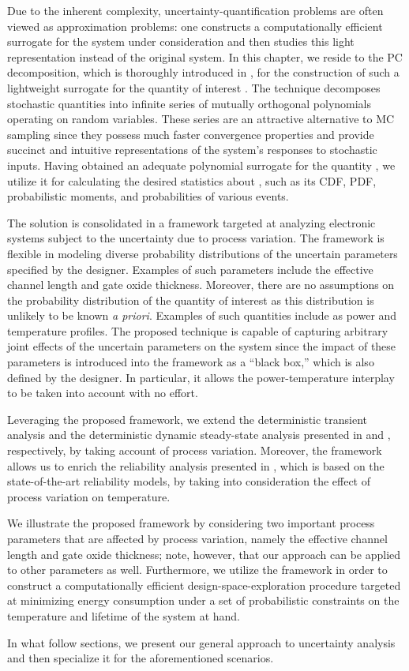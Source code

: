 Due to the inherent complexity, uncertainty-quantification problems are often
viewed as approximation problems: one constructs a computationally efficient
surrogate for the system under consideration and then studies this light
representation instead of the original system. In this chapter, we reside to the
\ac{PC} decomposition, which is thoroughly introduced in
, for the construction of such a lightweight surrogate
for the quantity of interest \g. The technique decomposes stochastic quantities
into infinite series of mutually orthogonal polynomials operating on random
variables. These series are an attractive alternative to \ac{MC} sampling since
they possess much faster convergence properties and provide succinct and
intuitive representations of the system's responses to stochastic inputs. Having
obtained an adequate polynomial surrogate for the quantity \g, we utilize it for
calculating the desired statistics about \g, such as its \ac{CDF}, \ac{PDF},
probabilistic moments, and probabilities of various events.

The solution is consolidated in a framework targeted at analyzing electronic
systems subject to the uncertainty due to process variation. The framework is
flexible in modeling diverse probability distributions of the uncertain
parameters specified by the designer. Examples of such parameters include the
effective channel length and gate oxide thickness. Moreover, there are no
assumptions on the probability distribution of the quantity of interest as this
distribution is unlikely to be known \emph{a priori}. Examples of such
quantities include as power and temperature profiles. The proposed technique is
capable of capturing arbitrary joint effects of the uncertain parameters on the
system since the impact of these parameters is introduced into the framework as
a ``black box,'' which is also defined by the designer. In particular, it allows
the power-temperature interplay to be taken into account with no effort.

Leveraging the proposed framework, we extend the deterministic transient
analysis and the deterministic dynamic steady-state analysis presented in
 and , respectively, by
taking account of process variation. Moreover, the framework allows us to enrich
the reliability analysis presented in , which is based
on the state-of-the-art reliability models, by taking into consideration the
effect of process variation on temperature.

We illustrate the proposed framework by considering two important process
parameters that are affected by process variation, namely the effective channel
length and gate oxide thickness; note, however, that our approach can be applied
to other parameters as well. Furthermore, we utilize the framework in order to
construct a computationally efficient design-space-exploration procedure
targeted at minimizing energy consumption under a set of probabilistic
constraints on the temperature and lifetime of the system at hand.

In what follow sections, we present our general approach to uncertainty analysis
and then specialize it for the aforementioned scenarios.

